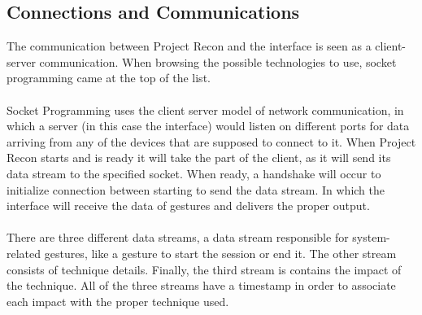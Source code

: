 \subsection{Connections and Communications}
The communication between Project Recon and the interface is seen as a client-server communication. When browsing the possible technologies to use, socket programming came at the top of the list.
\\
\\
Socket Programming uses the client server model of network communication, in which a server (in this case the interface) would listen on different ports for data arriving from any of the devices that are supposed to connect to it. When Project Recon starts and is ready it will take the part of the client, as it will send its data stream to the specified socket. When ready, a handshake will occur to initialize connection between starting to send the data stream. In which the interface will receive the data of gestures and delivers the proper output.
\\
\\
There are three different data streams, a data stream responsible for system-related gestures, like a gesture to start the session or end it. The other stream consists of technique details. Finally, the third stream is contains the impact of the technique. All of the three streams have a timestamp in order to associate each impact with the proper technique used.


